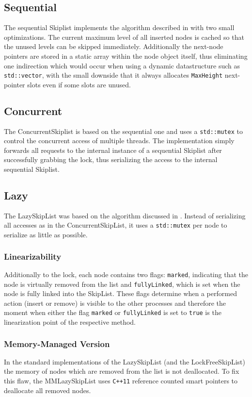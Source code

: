 \subsection{Sequential}
The sequential Skiplist implements the algorithm described in \cite{Herlihy:2008:AMP:1734069} with two small optimizations. The current maximum level of all inserted nodes is cached so that the unused levels can be skipped immediately. Additionally the next-node pointers are stored in a static array within the node object itself, thus eliminating one indirection which would occur when using a dynamic datastructure such as \texttt{std::vector}, with the small downside that it always allocates \texttt{MaxHeight} next-pointer slots even if some slots are unused.

\subsection{Concurrent}
The ConcurrentSkiplist is based on the sequential one and uses a \texttt{std::mutex} to control the concurrent access of multiple threads. The implementation simply forwards all requests to the internal instance of a sequential Skiplist after successfully grabbing the lock, thus serializing the access to the internal sequential Skiplist.

\subsection{Lazy}
The LazySkipList was based on the algorithm discussed in \cite{}. Instead of serializing all accesses as in the ConcurrentSkipList, it uses a \texttt{std::mutex} per node to serialize as little as possible.

\subsubsection*{Linearizability}
Additionally to the lock, each node contains two flags: \texttt{marked}, indicating that the node is virtually removed from the list and \texttt{fullyLinked}, which is set when the node is fully linked into the SkipList. These flags determine when a performed action (insert or remove) is visible to the other processes and therefore the moment when either the flag \texttt{marked} or \texttt{fullyLinked} is set to \texttt{true} is the linearization point of the respective method.

\subsubsection*{Memory-Managed Version}
In the standard implementations of the LazySkipList (and the LockFreeSkipList) the memory of nodes which are removed from the list is not deallocated. To fix this flaw, the MMLazySkipList uses \texttt{C++11} reference counted smart pointers to deallocate all removed nodes.

